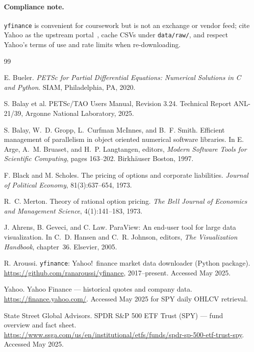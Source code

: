 \documentclass[11pt]{article}
\begin{document}
\paragraph{Compliance note.}
\texttt{yfinance} is convenient for coursework but is not an exchange or vendor
feed; cite Yahoo as the upstream portal~\cite{yahoofinance}, cache CSVs under
\texttt{data/raw/}, and respect Yahoo's terms of use and rate limits when re-downloading.








\newpage
\begin{thebibliography}{99}

E. Bueler.
\newblock \emph{PETSc for Partial Differential Equations: Numerical Solutions in {C} and {Python}}.
\newblock SIAM, Philadelphia, PA, 2020.

S. Balay et al.
\newblock PETSc/TAO Users Manual, Revision 3.24.
\newblock Technical Report ANL-21/39, Argonne National Laboratory, 2025.

S. Balay, W.~D. Gropp, L.~Curfman McInnes, and B.~F. Smith.
\newblock Efficient management of parallelism in object oriented numerical software libraries.
\newblock In E. Arge, A.~M. Bruaset, and H.~P. Langtangen, editors,
\emph{Modern Software Tools for Scientific Computing}, pages 163--202. Birkh{\"a}user Boston, 1997.

F. Black and M. Scholes.
\newblock The pricing of options and corporate liabilities.
\newblock \emph{Journal of Political Economy}, 81(3):637--654, 1973.

R.~C. Merton.
\newblock Theory of rational option pricing.
\newblock \emph{The Bell Journal of Economics and Management Science}, 4(1):141--183, 1973.

J. Ahrens, B. Geveci, and C. Law.
\newblock ParaView: An end-user tool for large data visualization.
\newblock In C.~D. Hansen and C.~R. Johnson, editors, \emph{The Visualization Handbook}, chapter~36. Elsevier, 2005.

R. Aroussi.
\newblock \texttt{yfinance}: Yahoo!\ finance market data downloader (Python package).
\newblock \url{https://github.com/ranaroussi/yfinance}, 2017--present.
\newblock Accessed May 2025.

Yahoo.
\newblock Yahoo Finance --- historical quotes and company data.
\newblock \url{https://finance.yahoo.com/}.
\newblock Accessed May 2025 for SPY daily OHLCV retrieval.

State Street Global Advisors.
\newblock SPDR S\&P 500 ETF Trust (SPY) --- fund overview and fact sheet.
\newblock \url{https://www.ssga.com/us/en/institutional/etfs/funds/spdr-sp-500-etf-trust-spy}.
\newblock Accessed May 2025.

\end{thebibliography}
\end{document}
